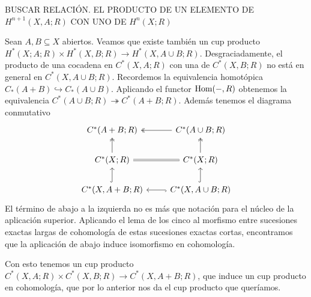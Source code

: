 \documentclass[TA.tex]{subfiles}
\begin{document}
BUSCAR RELACIÓN. EL PRODUCTO DE UN ELEMENTO DE $H^{n+1}(X,A;R)$ CON UNO DE $H^n(X;R)$

Sean $A,B\subseteq X$ abiertos. Veamos que existe también un cup producto $H^*(X;A;R)\times H^*(X,B;R)\to H^*(X,A\cup B;R)$. Desgraciadamente, el producto de una cocadena en $C^*(X,A;R)$ con una de $C^*(X,B;R)$ no está en general en $C^*(X,A\cup B;R)$. Recordemos la equivalencia homotópica $C_*(A+B)\hookrightarrow C_*(A\cup B)$. Aplicando el functor $\operatorname{Hom}(-,R)$ obtenemos la equivalencia $C^*(A\cup B;R)\twoheadrightarrow C^*(A+B;R)$. Además tenemos el diagrama conmutativo
\[
\begin{tikzcd}
C^*(A+B;R) & C^*(A\cup B;R)\arrow[l, twoheadrightarrow]\\
C^*(X;R)\arrow[u, twoheadrightarrow]\arrow[r, equals] & C^*(X;R)\arrow[u, twoheadrightarrow]\\
C^*(X,A+B;R)\arrow[u, hookrightarrow] & C^*(X,A\cup B;R)\arrow[l, hookrightarrow]\arrow[u, hookrightarrow]
\end{tikzcd}
\]
El término de abajo a la izquierda no es más que notación para el núcleo de la aplicación superior. Aplicando el lema de los cinco al morfismo entre sucesiones exactas largas de cohomología de estas sucesiones exactas cortas, encontramos que la aplicación de abajo induce isomorfismo en cohomología. 

Con esto tenemos un cup producto $C^*(X,A;R)\times C^*(X,B;R)\to C^*(X,A+B;R)$, que induce un cup producto en cohomología, que por lo anterior nos da el cup producto que queríamos. 
\end{document}
